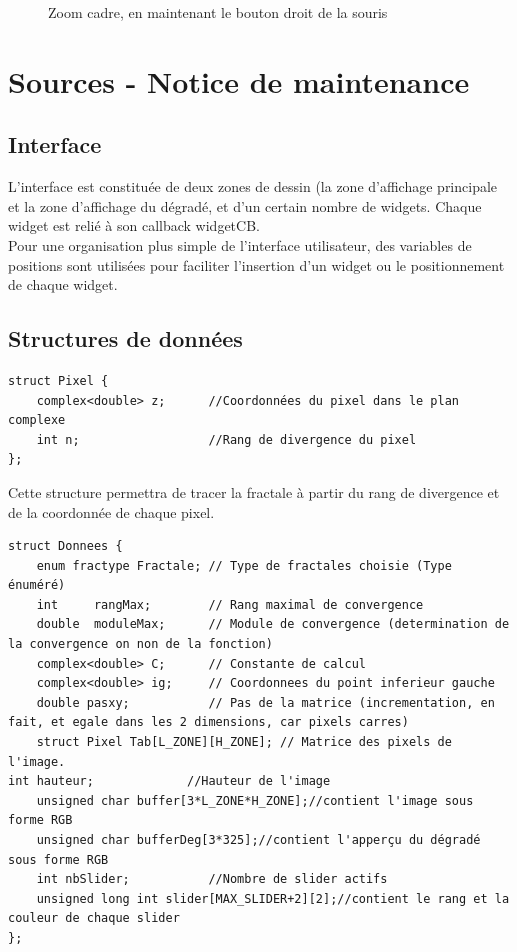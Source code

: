 \documentclass[a4paper,11pt]{article} \usepackage[T1]{fontenc} \usepackage[utf8]{inputenc} \usepackage[francais]{babel}
\begin{document}
\begin{itemize}
\begin{figure}[H]
\begin{center}
            \caption{Zoom cadre, en maintenant le bouton droit de la souris}
        \end{center} \end{figure}

\end{itemize}



\section{Sources - Notice de maintenance}

\subsection{Interface}%
L'interface est constituée de deux zones de dessin (la zone d'affichage principale et la zone d'affichage du dégradé, et d'un certain nombre de widgets. Chaque widget est relié à son callback widgetCB.\\

Pour une organisation plus simple de l'interface utilisateur, des variables de positions sont utilisées pour faciliter l'insertion d'un widget ou le positionnement  de chaque widget.
\subsection{Structures de données}
\begin{lstlisting}
struct Pixel {
    complex<double> z;      //Coordonnées du pixel dans le plan complexe
    int n;                  //Rang de divergence du pixel
};
\end{lstlisting}

Cette structure permettra de tracer la fractale à partir du rang de divergence et de la coordonnée de chaque pixel.

\begin{lstlisting}
struct Donnees {
    enum fractype Fractale; // Type de fractales choisie (Type énuméré)
    int     rangMax;        // Rang maximal de convergence
    double  moduleMax;      // Module de convergence (determination de la convergence on non de la fonction)
    complex<double> C;      // Constante de calcul
    complex<double> ig;     // Coordonnees du point inferieur gauche
    double pasxy;           // Pas de la matrice (incrementation, en fait, et egale dans les 2 dimensions, car pixels carres)
    struct Pixel Tab[L_ZONE][H_ZONE]; // Matrice des pixels de l'image.
int hauteur;             //Hauteur de l'image
    unsigned char buffer[3*L_ZONE*H_ZONE];//contient l'image sous forme RGB
    unsigned char bufferDeg[3*325];//contient l'apperçu du dégradé sous forme RGB
    int nbSlider;           //Nombre de slider actifs
    unsigned long int slider[MAX_SLIDER+2][2];//contient le rang et la couleur de chaque slider
};

\end{lstlisting}
\end{document}
